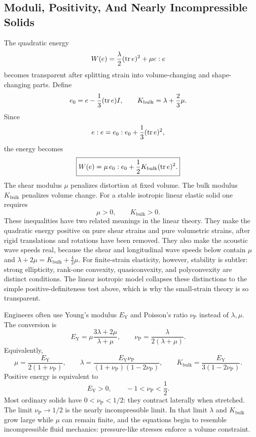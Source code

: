 \subsection{Moduli, Positivity, And Nearly Incompressible Solids}
\label{subsec:elastic-moduli-positivity}

The quadratic energy
\[
  W(e)=\frac{\lambda}{2}(\operatorname{tr} e)^2+\mu e:e
\]
becomes transparent after splitting strain into volume-changing and
shape-changing parts. Define
\[
  e_0=e-\frac13(\operatorname{tr} e)I,
  \qquad
  K_{\mathrm{bulk}}=\lambda+\frac23\mu .
\]
Since
\[
  e:e=e_0:e_0+\frac13(\operatorname{tr} e)^2,
\]
the energy becomes
\[
  \boxed{
  W(e)=\mu\,e_0:e_0+\frac12K_{\mathrm{bulk}}(\operatorname{tr} e)^2.
  }
\]
The shear modulus \(\mu\) penalizes distortion at fixed volume. The bulk
modulus \(K_{\mathrm{bulk}}\) penalizes volume change. For a stable isotropic
linear elastic solid one requires
\[
  \mu>0,
  \qquad
  K_{\mathrm{bulk}}>0.
\]
These inequalities have two related meanings in the linear theory. They make
the quadratic energy positive on pure shear strains and pure volumetric
strains, after rigid translations and rotations have been removed. They also
make the acoustic wave speeds real, because the shear and longitudinal wave
speeds below contain \(\mu\) and
\(\lambda+2\mu=K_{\mathrm{bulk}}+\frac43\mu\). For finite-strain elasticity,
however, stability is subtler: strong ellipticity, rank-one convexity,
quasiconvexity, and polyconvexity are distinct conditions. The linear isotropic
model collapses these distinctions to the simple positive-definiteness test
above, which is why the small-strain theory is so transparent.

Engineers often use Young's modulus \(E_{\mathrm Y}\) and Poisson's ratio
\(\nu_{\mathrm P}\) instead of \(\lambda,\mu\). The conversion is
\[
  \boxed{
  E_{\mathrm Y}
  =
  \mu\frac{3\lambda+2\mu}{\lambda+\mu},
  \qquad
  \nu_{\mathrm P}
  =
  \frac{\lambda}{2(\lambda+\mu)}.
  }
\]
Equivalently,
\[
  \boxed{
  \mu=\frac{E_{\mathrm Y}}{2(1+\nu_{\mathrm P})},
  \qquad
  \lambda=
  \frac{E_{\mathrm Y}\nu_{\mathrm P}}
  {(1+\nu_{\mathrm P})(1-2\nu_{\mathrm P})},
  \qquad
  K_{\mathrm{bulk}}=
  \frac{E_{\mathrm Y}}{3(1-2\nu_{\mathrm P})}.
  }
\]
Positive energy is equivalent to
\[
  E_{\mathrm Y}>0,
  \qquad
  -1<\nu_{\mathrm P}<\frac12.
\]
Most ordinary solids have \(0<\nu_{\mathrm P}<1/2\): they contract laterally
when stretched. The limit \(\nu_{\mathrm P}\to1/2\) is the nearly
incompressible limit. In that limit \(\lambda\) and \(K_{\mathrm{bulk}}\) grow
large while \(\mu\) can remain finite, and the equations begin to resemble
incompressible fluid mechanics: pressure-like stresses enforce a volume
constraint.

